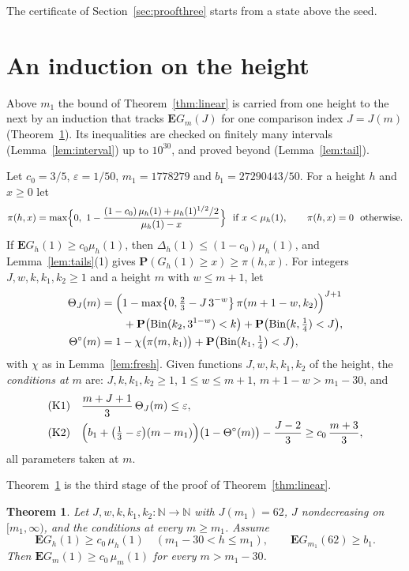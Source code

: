 \documentclass[11pt]{amsart}
\newtheorem{theorem}{Theorem}[section]
\theoremstyle{definition}
\numberwithin{equation}{section}
\newcommand{\lean}[1]{\ignorespaces}
\newcommand{\N}{\mathbb{N}}
\newcommand{\E}{\mathbf{E}}
\renewcommand{\P}{\mathbf{P}}
\newcommand{\eps}{\varepsilon}
\newcommand{\Bin}{\operatorname{Bin}}
\begin{document}
The certificate of Section~\ref{sec:proofthree} starts from a state above the seed.

\section{An induction on the height}\label{sec:dprime}

Above $m_1$ the bound of Theorem~\ref{thm:linear} is carried from one height to the next by an induction that tracks $\E G_m(J)$ for one comparison index $J=J(m)$ (Theorem~\ref{thm:dprime}). Its inequalities are checked on finitely many intervals (Lemma~\ref{lem:interval}) up to $10^{30}$, and proved beyond (Lemma~\ref{lem:tail}).

Let $c_0=3/5$, $\eps=1/50$, $m_1=1778279$ and $b_1=27290443/50$. For a height $h$ and $x\ge0$ let
\[
\pi(h,x)=\max\Bigl\{0,\ 1-\frac{(1-c_0)\,\mu_h(1)+\mu_h(1)^{1/2}/2}{\mu_h(1)-x}\Bigr\}\ \text{ if }x<\mu_h(1),\qquad\pi(h,x)=0\ \text{ otherwise}.
\]
If $\E G_h(1)\ge c_0\mu_h(1)$, then $\Delta_h(1)\le(1-c_0)\mu_h(1)$, and Lemma~\ref{lem:tails}(1) gives $\P(G_h(1)\ge x)\ge\pi(h,x)$. For integers $J,w,k,k_1,k_2\ge1$ and a height $m$ with $w\le m+1$, let
\begin{align*}
\Theta_J(m)&=\Bigl(1-\max\bigl\{0,\tfrac23-J\,3^{-w}\bigr\}\,\pi(m+1-w,k_2)\Bigr)^{J+1}\\
&\qquad+\P\bigl(\Bin(k_2,3^{1-w})<k\bigr)+\P\bigl(\Bin(k,\tfrac14)<J\bigr),\\
\Theta^\circ(m)&=1-\chi\bigl(\pi(m,k_1)\bigr)+\P\bigl(\Bin(k_1,\tfrac14)<J\bigr),
\end{align*}
with $\chi$ as in Lemma~\ref{lem:fresh}. Given functions $J,w,k,k_1,k_2$ of the height, the \emph{conditions at} $m$ are: $J,k,k_1,k_2\ge1$, $1\le w\le m+1$, $m+1-w>m_1-30$, and
\begin{align*}
&\text{(K1)}\quad\frac{m+J+1}3\,\Theta_J(m)\le\eps,\\
&\text{(K2)}\quad\Bigl(b_1+\bigl(\tfrac13-\eps\bigr)(m-m_1)\Bigr)\bigl(1-\Theta^\circ(m)\bigr)-\frac{J-2}3\ge c_0\,\frac{m+3}3,
\end{align*}
all parameters taken at $m$.

Theorem~\ref{thm:dprime} is the third stage of the proof of Theorem~\ref{thm:linear}.

\begin{theorem}\label{thm:dprime}\lean{FrogModel.D3.Assembly.thmDprime1_proof, FrogModel.D3.Iface.thmDprime1, FrogModel.D3.LaneE.thmDprime1_of, FrogModel.D3.Iface.DCond, FrogModel.D3.Iface.LJ, FrogModel.D3.Iface.L1, FrogModel.D3.Iface.jackLower}
Let $J,w,k,k_1,k_2:\N\to\N$ with $J(m_1)=62$, $J$ nondecreasing on $[m_1,\infty)$, and the conditions at every $m\ge m_1$. Assume
\[
\E G_h(1)\ge c_0\,\mu_h(1)\quad(m_1-30<h\le m_1),\qquad\E G_{m_1}(62)\ge b_1.
\]
Then $\E G_m(1)\ge c_0\,\mu_m(1)$ for every $m>m_1-30$.
\end{theorem}
\end{document}
